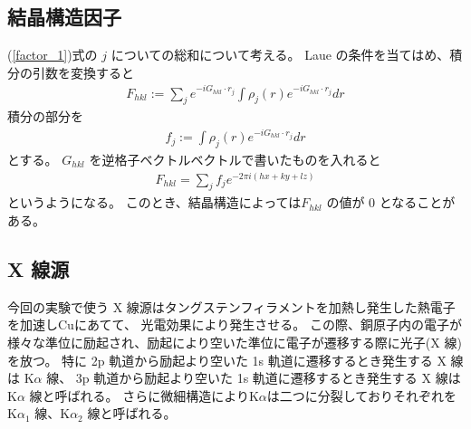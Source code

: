 \documentclass[11pt,dvipdfmx,a4paper]{jsarticle}
\begin{document}
\subsection{結晶構造因子}
(\ref{factor_1})式の \(j\) についての総和について考える。
Laue の条件を当てはめ、積分の引数を変換すると
\begin{align}
	F_{hkl} := \sum_j e^{-iG_{hkl}\cdot r_j} \int \rho_j(r) e^{-iG_{hkl}\cdot r_j}dr
\end{align}
積分の部分を
\begin{align}
	f_j :=\int \rho_j(r) e^{-iG_{hkl}\cdot r_j}dr
\end{align}
とする。
\(G_{hkl}\) を逆格子ベクトルベクトルで書いたものを入れると
\begin{align}
	F_{hkl} = \sum_j f_j e^{-2\pi i (hx + ky + lz)}
\end{align}
というようになる。
このとき、結晶構造によっては\(F_{hkl}\) の値が 0 となることがある。

\subsection{X 線源}
今回の実験で使う X 線源はタングステンフィラメントを加熱し発生した熱電子を加速しCuにあてて、
光電効果により発生させる。
この際、銅原子内の電子が様々な準位に励起され、励起により空いた準位に電子が遷移する際に光子(X 線)を放つ。
特に
2p 軌道から励起より空いた 1s 軌道に遷移するとき発生する X 線は K\(\alpha\) 線、
3p 軌道から励起より空いた 1s 軌道に遷移するとき発生する X 線は K\(\alpha\) 線と呼ばれる。
さらに微細構造によりK\(\alpha\)は二つに分裂しておりそれぞれを
K\(\alpha_1\) 線、K\(\alpha_2\) 線と呼ばれる。
\end{document}
